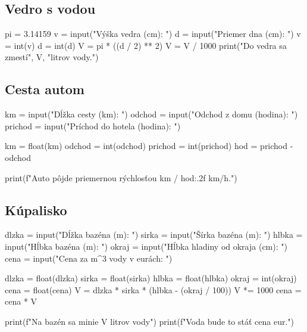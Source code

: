 \subsection{Vedro s vodou}
\begin{solution}
pi = 3.14159
v = input("Výška vedra (cm): ")
d = input("Priemer dna (cm): ")
v = int(v)
d = int(d)
V = pi * ((d / 2) ** 2)
V = V / 1000
print("Do vedra sa zmestí", V, "litrov vody.")
\end{solution}

\subsection{Cesta autom}
\begin{solution}
km = input("Dĺžka cesty (km): ")
odchod = input("Odchod z domu (hodina): ")
prichod = input("Príchod do hotela (hodina): ")

km = float(km)
odchod = int(odchod)
prichod = int(prichod)
hod = prichod - odchod

print(f"Auto pôjde priemernou rýchlosťou {km / hod:.2f} km/h.")
\end{solution}

\subsection{Kúpalisko}
\begin{solution}
dlzka = input("Dĺžka bazéna (m): ")
sirka = input("Šírka bazéna (m): ")
hlbka = input("Hĺbka bazéna (m): ")
okraj = input("Hĺbka hladiny od okraja (cm): ")
cena = input("Cena za m^3 vody v eurách: ")

dlzka = float(dlzka)
sirka = float(sirka)
hlbka = float(hlbka)
okraj = int(okraj)
cena = float(cena)
V = dlzka * sirka * (hlbka - (okraj / 100))
V *= 1000
cena = cena * V

print(f"Na bazén sa minie {V} litrov vody")
print(f"Voda bude to stáť {cena} eur.")
\end{solution}

